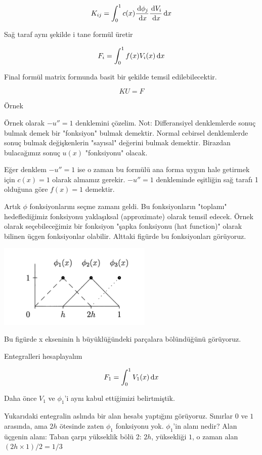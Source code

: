 \documentclass[12pt,fleqn]{article}\usepackage{../../common}
\begin{document}
$$ K_{ij} = \int_0^1 c(x) \frac{\,\mathrm{d}\phi_j}{\,\mathrm{d} x} \frac{\,\mathrm{d} V_i}{\,\mathrm{d} x} \,\mathrm{d} x  $$

Sağ taraf aynı şekilde i tane formül üretir

$$ F_i = \int_0^1 f(x)V_i(x) \,\mathrm{d} x $$

Final formül matrix formunda basit bir şekilde temsil edilebilecektir. 

$$ KU = F $$

Örnek

Örnek olarak $-u'' = 1$ denklemini çözelim. Not: Differansiyel
denklemlerde sonuç bulmak demek bir "fonksiyon" bulmak
demektir. Normal cebirsel denklemlerde sonuç bulmak değişkenlerin
"sayısal" değerini bulmak demektir. Birazdan bulacağımız sonuç
$u(x)$ "fonksiyonu" olacak.

Eğer denklem $-u''=1$ ise o zaman bu formülü ana forma uygun hale
getirmek için $c(x) = 1$ olarak almamız gerekir. $-u''=1$ denkleminde
eşitliğin sağ tarafı 1 olduğuna göre $f(x) = 1$ demektir.

Artık $\phi$ fonksiyonlarını seçme zamanı geldi. Bu fonksiyonların
"toplamı" hedeflediğimiz fonksiyonu yaklaşıksal (approximate) olarak
temsil edecek. Örnek olarak seçebileceğimiz bir fonksiyon "şapka
fonksiyonu (hat function)" olarak bilinen üçgen fonksiyonlar
olabilir. Alttaki figürde bu fonksiyonları görüyoruz.

\includegraphics[height=4cm]{fem_hat.png}

Bu figürde x ekseninin h büyüklüğündeki parçalara bölündüğünü görüyoruz. 

Entegralleri hesaplayalım

$$ F_1 = \int_0^1 V_1(x) \,\mathrm{d} x $$

Daha önce $V_1$ ve $\phi_1$'i aynı kabul ettiğimizi belirtmiştik. 

Yukarıdaki entegralin aslında bir alan hesabı yaptığını
görüyoruz. Sınırlar $0$ ve $1$ arasında, ama $2h$ ötesinde zaten
$\phi_1$ fonksiyonu yok. $\phi_1$'in alanı nedir? Alan üçgenin alanı:
Taban çarpı yükseklik bölü 2: $2h$, yüksekliği $1$, o zaman alan $(2h
\times 1) / 2 = 1/3$
\end{document}
